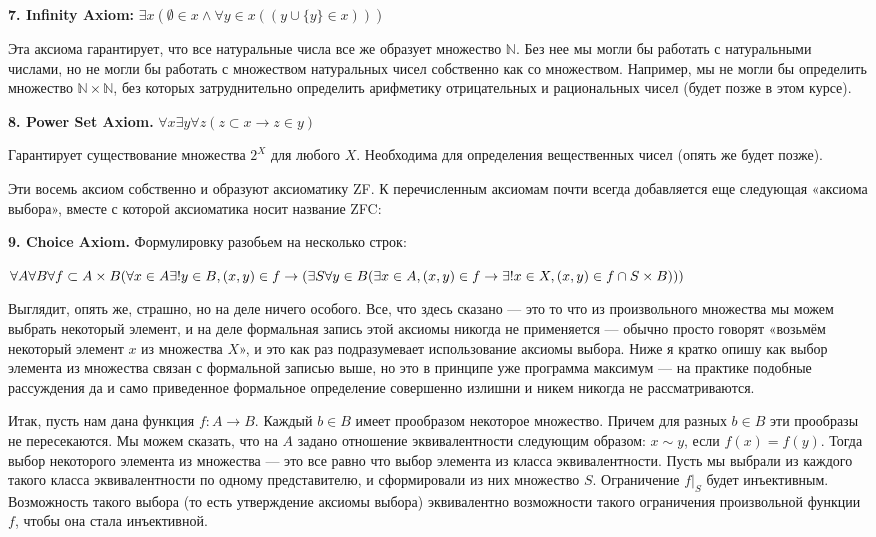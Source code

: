 {\bfseries 7. Infinity Axiom:} $\exists x (\emptyset \in x \wedge \forall y \in x ((y\cup\{y\}\in x)))$

Эта аксиома гарантирует, что все натуральные числа все же образует множество $\mathbb{N}$. Без нее мы могли бы работать с натуральными числами, но не могли бы работать с множеством натуральных чисел собственно как со множеством. Например, мы не могли бы определить множество $\mathbb{N}\times\mathbb{N}$, без которых затруднительно определить арифметику отрицательных и рациональных чисел (будет позже в этом курсе).

{\bfseries 8. Power Set Axiom.} $\forall x \exists y \forall z (z\subset x \rightarrow z\in y)$

Гарантирует существование множества $2^X$ для любого $X$. Необходима для определения вещественных чисел (опять же будет позже).

Эти восемь аксиом собственно и образуют аксиоматику ZF. К перечисленным аксиомам почти всегда добавляется еще следующая «аксиома выбора», вместе с которой аксиоматика носит название ZFC:

{\bfseries 9. Choice Axiom.} Формулировку разобьем на несколько строк:

$\forall A \forall B \forall f\subset A\times B \\(\forall x \in A \exists! y\in B, (x, y)\in f\rightarrow\\ (\exists S\forall y\in B(\exists x\in A, (x, y)\in f \rightarrow \\ \exists!x\in X, (x, y)\in f\cap S\times B)))$

Выглядит, опять же, страшно, но на деле ничего особого. Все, что здесь сказано — это то что из произвольного множества мы можем выбрать некоторый элемент, и на деле формальная запись этой аксиомы никогда не применяется — обычно просто говорят «возьмём некоторый элемент $x$ из множества $X$», и это как раз подразумевает использование аксиомы выбора. Ниже я кратко опишу как выбор элемента из множества связан с формальной записью выше, но это в принципе уже программа максимум — на практике подобные рассуждения да и само приведенное формальное определение совершенно излишни и никем никогда не рассматриваются.

Итак, пусть нам дана функция $f: A\to B$. Каждый $b \in B$ имеет прообразом некоторое множество. Причем для разных $b\in B$ эти прообразы не пересекаются. Мы можем сказать, что на $A$ задано отношение эквивалентности следующим образом: $x\sim y$, если $f(x) = f(y)$. Тогда выбор некоторого элемента из множества — это все равно что выбор элемента из класса эквивалентности. Пусть мы выбрали из каждого такого класса эквивалентности по одному представителю, и сформировали из них множество $S$. Ограничение $f|_S$ будет инъективным. Возможность такого выбора (то есть утверждение аксиомы выбора) эквивалентно возможности такого ограничения произвольной функции $f$, чтобы она стала инъективной.

